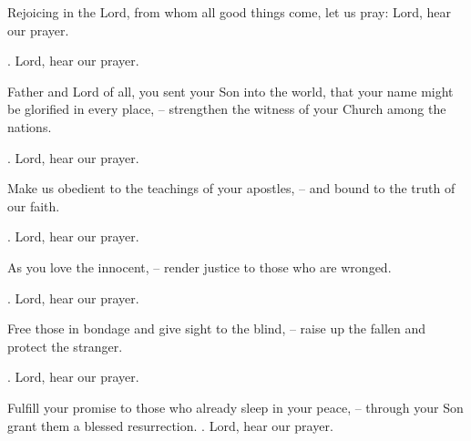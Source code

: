 \lettrine[lines=2]{R}{}ejoicing in the Lord, from whom all good things come, let us pray: Lord, hear our prayer.
\par \Rbar. Lord, hear our prayer.

Father and Lord of all, you sent your Son into the world, that your name might be glorified in every place,
– strengthen the witness of your Church among the nations.
\par \Rbar. Lord, hear our prayer.

Make us obedient to the teachings of your apostles,
– and bound to the truth of our faith.
\par \Rbar. Lord, hear our prayer.

As you love the innocent,
– render justice to those who are wronged.
\par \Rbar. Lord, hear our prayer.

Free those in bondage and give sight to the blind,
– raise up the fallen and protect the stranger.
\par \Rbar. Lord, hear our prayer.

Fulfill your promise to those who already sleep in your peace,
– through your Son grant them a blessed resurrection.
\Rbar. Lord, hear our prayer.
